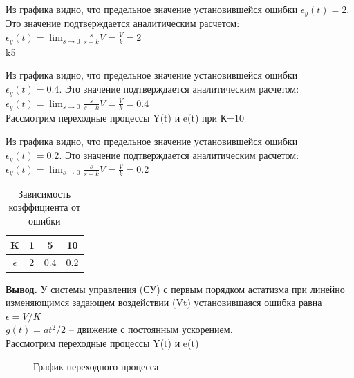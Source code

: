 \documentclass[a4paper, 11pt]{article}
\begin{document}
Из графика видно, что предельное значение установившейся ошибки $\epsilon_y(t)=2$. Это значение подтверждается аналитическим расчетом: $\epsilon_y(t)=\lim_{s\to0}\frac{s}{s+k}V=\frac{V}{k}=2$\\
k5

Из графика видно, что предельное значение установившейся ошибки $\epsilon_y(t)=0.4$. Это значение подтверждается аналитическим расчетом: $\epsilon_y(t)=\lim_{s\to0}\frac{s}{s+k}V=\frac{V}{k}=0.4$\\

Рассмотрим переходные процессы Y(t) и e(t) при К=10

Из графика видно, что предельное значение установившейся ошибки $\epsilon_y(t)=0.2$. Это значение подтверждается аналитическим расчетом: $\epsilon_y(t)=\lim_{s\to0}\frac{s}{s+k}V=\frac{V}{k}=0.2$\\

\begin{table}[h]
    \begin{center}
    \begin{tabular}{|c|c|c|c|}
    \hline
         K & 1 & 5 & 10 \\
         \hline
         $\epsilon$ & 2 & 0.4 & 0.2 \\
    \hline     
    \end{tabular}
    \caption{Зависимость коэффициента от ошибки}
    \label{tab:my_label}
    \end{center}
\end{table}

\textbf{Вывод.} У системы управления (СУ) с первым порядком астатизма при линейно изменяющимся задающем воздействии (Vt) установившаяся ошибка равна $\epsilon=V/K$\\

\newpage
$g(t)=at^2/2$ – движение с постоянным ускорением.\\

Рассмотрим переходные процессы Y(t) и e(t)


\begin{figure}[h!]
    \caption{График переходного процесса}
    \label{two}
\end{figure}
\end{document}
